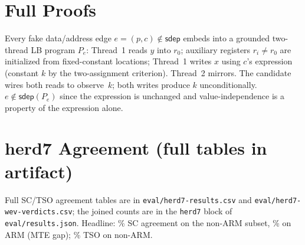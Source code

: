\documentclass{llncs}
\newcommand{\sdep}{\mathsf{sdep}}
\begin{document}
\appendix
\section{Full Proofs}

\begin{lemma}
Every fake data/address edge $e=(p,c) \notin \sdep$ embeds into a grounded
two-thread LB program $P_e$: Thread~1 reads $y$ into $r_0$; auxiliary
registers $r_i \neq r_0$ are initialized from fixed-constant locations;
Thread~1 writes $x$ using $c$'s expression (constant $k$ by the two-assignment
criterion). Thread~2 mirrors. The candidate wires both reads to observe~$k$;
both writes produce $k$ unconditionally. $e \notin \sdep(P_e)$ since the
expression is unchanged and value-independence is a property of the expression
alone.
\end{lemma}

\section{herd7 Agreement (full tables in artifact)}
Full SC/TSO agreement tables are in \texttt{eval/herd7-results.csv} and
\texttt{eval/herd7-wev-verdicts.csv}; the joined counts are in the
\texttt{herd7} block of \texttt{eval/results.json}.
Headline: \HerdNonArmSCPercent\% SC agreement on the non-ARM subset,
\HerdArmSCPercent\% on ARM (MTE gap); \HerdNonArmTSOPercent\% TSO on non-ARM.



\end{document}
